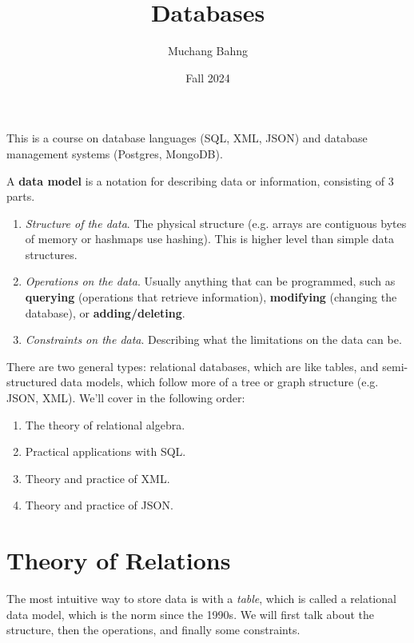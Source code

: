 \documentclass{article}
\begin{document}
\title{Databases}
\author{Muchang Bahng}
\date{Fall 2024}

\maketitle
\tableofcontents
\pagebreak 

  This is a course on database languages (SQL, XML, JSON) and database management systems (Postgres, MongoDB). 

  \begin{definition}
    A \textbf{data model} is a notation for describing data or information, consisting of 3 parts. 
    \begin{enumerate}
      \item \textit{Structure of the data}. The physical structure (e.g. arrays are contiguous bytes of memory or hashmaps use hashing). This is higher level than simple data structures. 
      \item \textit{Operations on the data}. Usually anything that can be programmed, such as \textbf{querying} (operations that retrieve information), \textbf{modifying} (changing the database), or \textbf{adding/deleting}. 
      \item \textit{Constraints on the data}. Describing what the limitations on the data can be. 
    \end{enumerate}
  \end{definition}

  There are two general types: relational databases, which are like tables, and semi-structured data models, which follow more of a tree or graph structure (e.g. JSON, XML). We'll cover in the following order: 
  \begin{enumerate}
    \item The theory of relational algebra. 
    \item Practical applications with SQL. 
    \item Theory and practice of XML.  
    \item Theory and practice of JSON. 
  \end{enumerate}

\section{Theory of Relations}

    The most intuitive way to store data is with a \textit{table}, which is called a relational data model, which is the norm since the 1990s. We will first talk about the structure, then the operations, and finally some constraints. 
\end{document}
